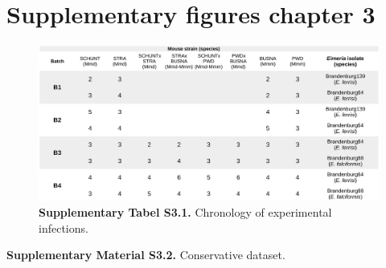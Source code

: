 \newpage

\section*{Supplementary figures chapter 3}

\begin{figure}[H]
	\centering
	\includegraphics[width=\linewidth,height=\textheight,keepaspectratio]{images/3article2/SupplementaryTableS1.pdf}
	\captionsetup{labelformat=empty}
	\caption{\textbf{Supplementary Tabel S3.1.} Chronology of experimental infections.}
\end{figure}

\newpage

\textbf{Supplementary Material S3.2.} Conservative dataset.

